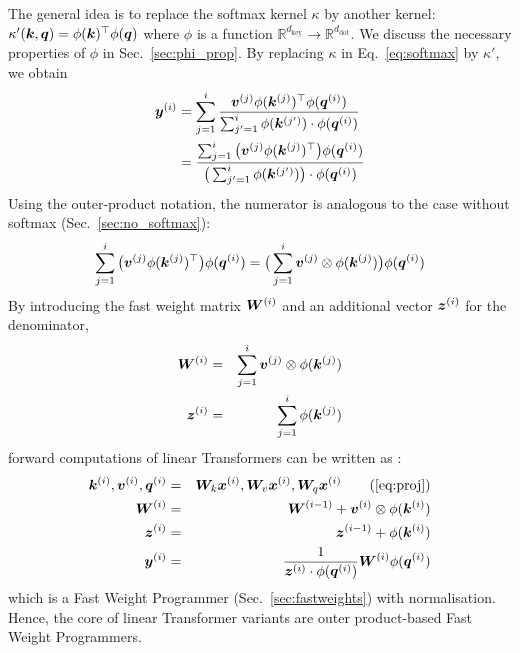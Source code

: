 \documentclass{article}
\theoremstyle{definition}
\begin{document}
The general idea is to replace the softmax kernel $\kappa$ by another kernel:
$\kappa'({\bm{k}}, {\bm{q}}) = \phi({\bm{k}})^{\top} \phi({\bm{q}})$
where $\phi$ is a function $\mathbb{R}^{d_\text{key}} \rightarrow \mathbb{R}^{d_\text{dot}}$.
We discuss the necessary properties of $\phi$ in Sec.~\ref{sec:phi_prop}.
By replacing $\kappa$ in Eq.~\ref{eq:softmax} by $\kappa'$, we obtain
\begin{align}
\label{eq:linearSM}
    {\bm{y}}^{(i)} & = \sum_{j=1}^i  \frac{
         {\bm{v}}^{(j)} \phi({\bm{k}}^{(j)})^{\top} \phi({\bm{q}}^{(i)})
         }{
         \sum_{j'=1}^i \phi({\bm{k}}^{(j')}) \cdot \phi({\bm{q}}^{(i)})
         } \\
    & = \displaystyle \frac{ \sum_{j=1}^i
         \big({\bm{v}}^{(j)} \phi({\bm{k}}^{(j)})^{\top} \big) \phi({\bm{q}}^{(i)})
         }{
         \big(\sum_{j'=1}^i \phi({\bm{k}}^{(j')})\big) \cdot \phi({\bm{q}}^{(i)})
         }
\end{align}
Using the outer-product notation,
the numerator is analogous to the case without softmax (Sec.~\ref{sec:no_softmax}):
\begin{eqnarray}
 \displaystyle \sum_{j=1}^i
         \big({\bm{v}}^{(j)} \phi({\bm{k}}^{(j)})^{\top} \big) \phi({\bm{q}}^{(i)}) = \displaystyle \big(\sum_{j=1}^i
         {\bm{v}}^{(j)} \otimes \phi({\bm{k}}^{(j)}) \big) \phi({\bm{q}}^{(i)}) \nonumber
\end{eqnarray}
By introducing the fast weight matrix ${\bm{W}}^{(i)}$ and an additional vector ${\bm{z}}^{(i)}$ for the denominator,
\begin{eqnarray}
{\bm{W}}^{(i)} &=& \sum_{j=1}^i {\bm{v}}^{(j)} \otimes \phi({\bm{k}}^{(j)}) \\
{\bm{z}}^{(i)} &=& \displaystyle \sum_{j=1}^i \phi({\bm{k}}^{(j)})
\end{eqnarray}
forward computations of linear Transformers can be written as \citep{katharopoulos2020transformers}:
\begin{eqnarray}
\vk^{(i)}, \vv^{(i)}, \vq^{(i)} &=& \mW_k \vx^{(i)}, \mW_v \vx^{(i)}, \mW_q \vx^{(i)}  \tag{\ref{eq:proj}}  \\
\mW^{(i)}  &=& \mW^{(i-1)} + \vv^{(i)}  \otimes \phi(\vk^{(i)}) \label{eq:fw_phi_add} \\
\vz^{(i)}  &=& \vz^{(i-1)}+ \phi(\vk^{(i)}) \\
\vy^{(i)}  &=& \displaystyle \dfrac{1}{\vz^{(i)} \cdot \phi(\vq^{(i)})} \mW^{(i)} \phi(\vq^{(i)}) \label{eq:fw_phi_get}
\end{eqnarray}
which is a Fast Weight Programmer (Sec.~\ref{sec:fastweights}) with normalisation.
Hence, the core of  linear Transformer variants 
are outer product-based Fast Weight Programmers.
\end{document}
